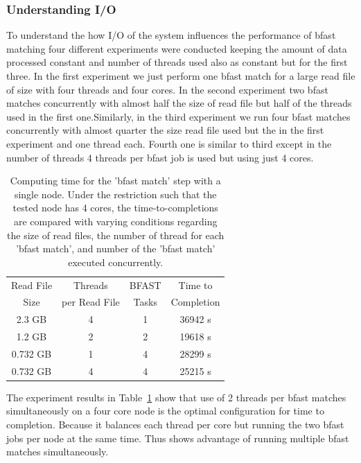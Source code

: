 \documentclass{acm_proc_article-sp}
\begin{document}
\subsubsection{Understanding I/O}
{
To understand the how I/O of the system influences the performance of bfast matching four different
 experiments were conducted keeping the amount of data processed constant and number of threads 
 used also as constant but for the first three. In the first experiment we just perform one bfast match for
  a large read file of size with four threads and four cores. In the second experiment two 
  bfast matches concurrently with almost half the size of read file but half of the threads 
  used in the first one.Similarly, in the third experiment we run four bfast matches 
  concurrently with almost quarter the size read file used but the in the first experiment
   and one thread each. Fourth one is similar to third except in the number of 
   threads 4 threads per bfast job is used but using just 4 cores.

 \begin{table}
 \begin{tabular}{|c|c|c|c|} 
 \hline 
Read File  & Threads  & BFAST  & Time to \\
Size & per Read File& Tasks &  Completion \\  \hline
2.3 GB &  4 & 1 & 36942 s \\
1.2 GB & 2 & 2 & 19618 s \\
0.732 GB & 1 & 4 & 28299 s\\ 
0.732  GB & 4 & 4 & 25215 s\\

 \hline
 \end{tabular}
 \label{table:understandio} 
 \caption{Computing time for the 'bfast match' step with a single node.  Under the restriction such that
  the tested node has 4 cores, the time-to-completions are compared with varying conditions 
  regarding the size of read files, the number of thread for each 'bfast match', and number of the 'bfast match' executed concurrently.}
\end{table}

The experiment results in Table~\ref{table:understandio} show that use of 2 threads per bfast matches simultaneously 
on a four core node is the optimal configuration for time to completion. Because it balances each thread per core but  
running the two bfast jobs per node at the same time. Thus shows advantage of running multiple bfast matches simultaneously. 


}
\end{document}
